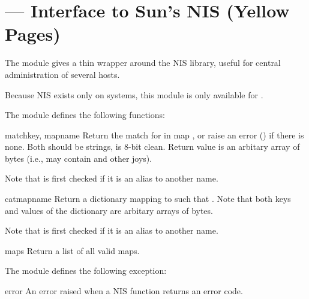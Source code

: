 \section{ ---
         Interface to Sun's NIS (Yellow Pages)}


The  module gives a thin wrapper around the NIS library, useful
for central administration of several hosts.

Because NIS exists only on \UNIX{} systems, this module is
only available for \UNIX{}.

The  module defines the following functions:

\begin{funcdesc}{match}{key, mapname}
Return the match for  in map , or raise an
error () if there is none.
Both should be strings,  is 8-bit clean.
Return value is an arbitary array of bytes (i.e., may contain 
and other joys).

Note that  is first checked if it is an alias to another name.
\end{funcdesc}

\begin{funcdesc}{cat}{mapname}
Return a dictionary mapping  to  such that
.
Note that both keys and values of the dictionary are arbitary
arrays of bytes.

Note that  is first checked if it is an alias to another name.
\end{funcdesc}

\begin{funcdesc}{maps}{}
Return a list of all valid maps.
\end{funcdesc}


The  module defines the following exception:

\begin{excdesc}{error}
An error raised when a NIS function returns an error code.
\end{excdesc}
